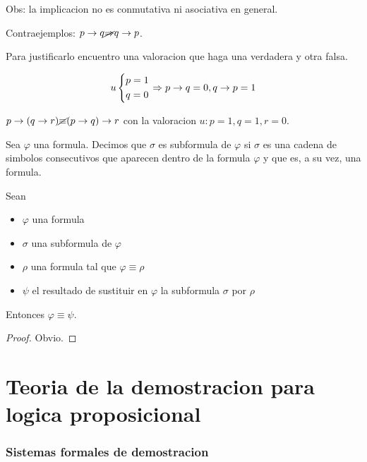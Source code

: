 \begin{example}
\begin{itemize}
\begin{table}[H]
			      \label{tab:label}
		      \end{table}

	\end{itemize}
	Obs: la implicacion no es conmutativa ni asociativa en general.

	Contraejemplos: \(p \rightarrow q \cancel \Rightarrow q \rightarrow p \).

	Para justificarlo encuentro una valoracion que haga una verdadera y otra falsa.

	\[
		u \begin{dcases}
			p = 1 \\
			q = 0
		\end{dcases}\Rightarrow p \rightarrow q = 0, q \rightarrow p = 1
	\]

	\(p \rightarrow (q \rightarrow r) \cancel \equiv (p \rightarrow q) \rightarrow r\) con la valoracion \(u: p = 1, q = 1, r = 0\).
\end{example}

\begin{definition}[Subformula]
	Sea \(\varphi\) una formula. Decimos que \(\sigma\) es subformula de \(\varphi\) si \(\sigma\) es una cadena de simbolos consecutivos que aparecen dentro de la formula \(\varphi\) y que es, a su vez, una formula.
\end{definition}

\begin{theorem}[de sustitucion]
	Sean \begin{itemize}
		\item \(\varphi\) una formula
		\item \(\sigma\) una subformula de \(\varphi\)
		\item \(\rho\) una formula tal que \(\varphi \equiv \rho\)
		\item \(\psi \) el resultado de sustituir en \(\varphi\) la subformula \(\sigma\) por \(\rho\)

	\end{itemize}
	Entonces \(\varphi \equiv \psi\).
\end{theorem}
\begin{proof}
	Obvio.
\end{proof}

\part{Teoria de la demostracion para logica proposicional}

\section{Sistemas formales de demostracion}

